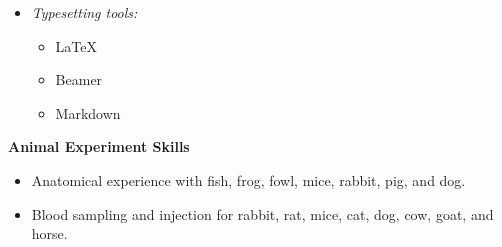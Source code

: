 \begin{multicols}{3}
\begin{itemize}
    \item \textit{Typesetting tools:}  
    \begin{itemize}  
        \item \LaTeX
        \item Beamer
        \item Markdown
    \end{itemize} 
\end{itemize}  
  
\end{multicols} %


\textbf{Animal Experiment Skills}

\begin{itemize}
    \item Anatomical experience with fish, frog, fowl, mice, rabbit, pig, and dog.
    \item Blood sampling and injection for rabbit, rat, mice, cat, dog, cow, goat, and horse.
\end{itemize}


